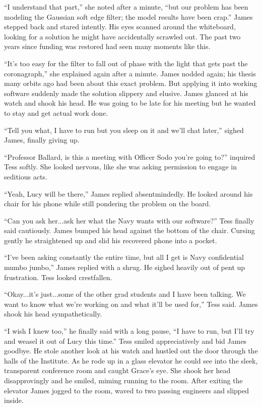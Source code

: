 \documentclass[openany, 12pt]{book} %
\begin{document}
``I understand that part,'' she noted after a minute, ``but our problem has been modeling the Gaussian soft edge filter; the model results have been crap.'' James stepped back and stared intently. His eyes scanned around the whiteboard, looking for a solution he might have accidentally scrawled out. The past two years since funding was restored had seen many moments like this.

``It's too easy for the filter to fall out of phase with the light that gets past the coronagraph,'' she explained again after a minute. James nodded again; his thesis many orbits ago had been about this exact problem. But applying it into working software suddenly made the solution slippery and elusive. James glanced at his watch and shook his head. He was going to be late for his meeting but he wanted to stay and get actual work done.

``Tell you what, I have to run but you sleep on it and we'll chat later,'' sighed James, finally giving up.

``Professor Ballard, is this a meeting with Officer Sodo you're going to?'' inquired Tess softly. She looked nervous, like she was asking permission to engage in seditious acts.

``Yeah, Lucy will be there,'' James replied absentmindedly. He looked around his chair for his phone while still pondering the problem on the board. 

``Can you ask her...ask her what the Navy wants with our software?'' Tess finally said cautiously. James bumped his head against the bottom of the chair. Cursing gently he straightened up and slid his recovered phone into a pocket.

``I've been asking constantly the entire time, but all I get is Navy confidential mumbo jumbo,'' James replied with a shrug. He sighed heavily out of pent up frustration. Tess looked crestfallen.

``Okay...it's just...some of the other grad students and I have been talking. We want to know what we're working on and what it'll be used for,'' Tess said. James shook his head sympathetically.

``I wish I knew too,'' he finally said with a long pause, ``I have to run, but I'll try and weasel it out of Lucy this time.'' Tess smiled appreciatively and bid James goodbye. He stole another look at his watch and hustled out the door through the halls of the Institute. As he rode up in a glass elevator he could see into the sleek, transparent conference room and caught Grace's eye. She shook her head disapprovingly and he smiled, miming running to the room. After exiting the elevator James jogged to the room, waved to two passing engineers and slipped inside.
\end{document}
